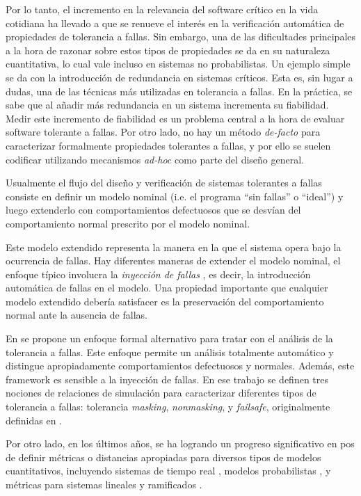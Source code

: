 Por lo tanto, el incremento en la relevancia del software crítico en la vida cotidiana ha llevado a que se renueve el interés en la verificación automática de propiedades de tolerancia a fallas. Sin embargo, una de las dificultades principales a la hora de razonar sobre estos tipos de propiedades se da en su naturaleza cuantitativa, lo cual vale incluso en sistemas no probabilistas.
Un ejemplo simple se da con la introducción de redundancia en sistemas críticos. Esta es, sin lugar a dudas, una de las técnicas más utilizadas en tolerancia a fallas.
En la práctica, se sabe que al añadir más redundancia en un sistema incrementa su fiabilidad. Medir este incremento de fiabilidad es un problema central a la hora de evaluar software tolerante a fallas. Por otro lado, no hay un método \emph{de-facto} para caracterizar formalmente propiedades tolerantes a fallas, y por ello se suelen codificar utilizando mecanismos \emph{ad-hoc} como parte del diseño general.

Usualmente el flujo del diseño y verificación de sistemas tolerantes a fallas consiste en definir un modelo nominal (i.e. el programa ``sin fallas'' o ``ideal'') y luego extenderlo con comportamientos defectuosos que se desvían del comportamiento normal prescrito por el modelo nominal.

Este modelo extendido representa la manera en la que el sistema opera bajo la ocurrencia de fallas.
Hay diferentes maneras de extender el modelo nominal, el enfoque típico involucra la \emph{inyección de fallas}  \cite{HsuehTI97,IyerNGK10}, es decir, la introducción automática de fallas en el modelo. Una propiedad importante que cualquier modelo extendido debería satisfacer es la preservación del comportamiento normal ante la ausencia de fallas.

En \cite{DemasiCMA17} se propone un enfoque formal alternativo para tratar con el análisis de la tolerancia a fallas. Este enfoque permite un análisis totalmente automático y distingue apropiadamente comportamientos defectuosos y normales. Además, este framework es sensible a la inyección de fallas. En ese trabajo se definen tres nociones de relaciones de simulación para caracterizar diferentes tipos de tolerancia a fallas:
tolerancia \emph{masking}, \emph{nonmasking}, y \emph{failsafe}, originalmente definidas en \cite{Gartner99}. 

    Por otro lado, en los últimos años, se ha logrando un progreso significativo en pos de definir métricas o distancias apropiadas para diversos tipos de modelos cuantitativos, incluyendo sistemas de tiempo real \cite{HenzingerMP05}, modelos probabilistas \cite{DesharnaisGJP04}, y métricas para sistemas lineales y ramificados \cite{CernyHR12,AlfaroFS09,Henzinger13,LarsenFT11,ThraneFL10}. 


